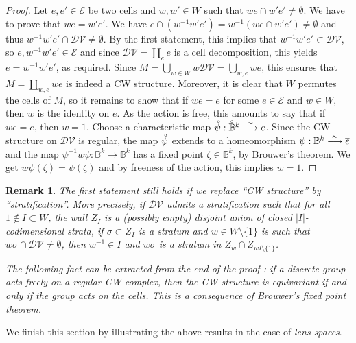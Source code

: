 \documentclass[11pt,twoside]{amsart}
\theoremstyle{plain}
\newtheorem{rem}[prop]{Remark}
\newcommand{\longto}{\longrightarrow}
\newcommand{\interior}[1]{\accentset{\circ}{#1}}
\begin{document}
\begin{proof}
Let $e,e'\in\mathcal{E}$ be two cells and $w,w'\in W$ such that $we\cap w'e'\ne\emptyset$. We have to prove that $we=w'e'$. We have $e\cap (w^{-1}w'e')=w^{-1}(we\cap w'e')\ne\emptyset$ and thus $w^{-1}w'e'\cap\mathcal{DV}\ne\emptyset$. By the first statement, this implies that $w^{-1}w'e'\subset\mathcal{DV}$, so $e,w^{-1}w'e'\in\mathcal{E}$ and since $\mathcal{DV}=\coprod_ee$ is a cell decomposition, this yields $e=w^{-1}w'e'$, as required. Since $M=\bigcup_{w\in W}w\mathcal{DV}=\bigcup_{w,e}we$, this ensures that $M=\coprod_{w,e}we$ is indeed a CW structure. Moreover, it is clear that $W$ permutes the cells of $M$, so it remains to show that if $we=e$ for some $e\in\mathcal{E}$ and $w\in W$, then $w$ is the identity on $e$. As the action is free, this amounts to say that if $we=e$, then $w=1$. Choose a characteristic map $\interior{\psi} : \interior{\mathbb{B}}^k\stackrel{\tiny{\sim}}\longto e$. Since the CW structure on $\mathcal{DV}$ is regular, the map $\interior{\psi}$ extends to a homeomorphism $\psi : \mathbb{B}^k\stackrel{\tiny{\sim}}\longto\overline{e}$ and the map $\psi^{-1}w\psi : \mathbb{B}^k\to\mathbb{B}^k$ has a fixed point $\zeta\in\mathbb{B}^k$, by Brouwer's theorem. We get $w{\psi}(\zeta)={\psi}(\zeta)$ and by freeness of the action, this implies $w=1$.
\end{proof}

\begin{rem}
The first statement still holds if we replace ``CW structure'' by ``stratification''. More precisely, if $\mathcal{DV}$ admits a stratification such that for all $1\notin I\subset W$, the wall $Z_I$ is a (possibly empty) disjoint union of closed $|I|$-codimensional strata, if $\sigma\subset Z_I$ is a stratum and $w\in W\setminus\{1\}$ is such that $w\sigma\cap\mathcal{DV}\ne\emptyset$, then $w^{-1}\in I$ and $w\sigma$ is a stratum in $Z_w\cap Z_{wI\setminus\{1\}}$.

The following fact can be extracted from the end of the proof : if a discrete group acts freely on a regular CW complex, then the CW structure is equivariant if and only if the group acts on the cells. This is a consequence of Brouwer's fixed point theorem.
\end{rem}

We finish this section by illustrating the above results in the case of \emph{lens spaces}.
\end{document}
